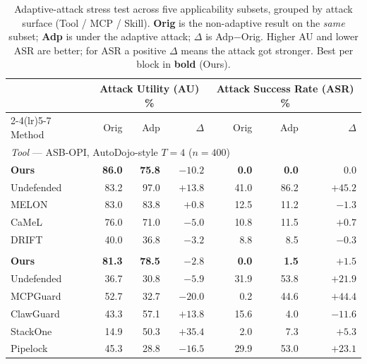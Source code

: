 \begin{table}[t]
\centering
\small
\setlength{\tabcolsep}{6pt}
\renewcommand{\arraystretch}{1.08}
\caption{Adaptive-attack stress test across five applicability subsets, grouped by
attack surface (Tool / MCP / Skill). \textbf{Orig} is the non-adaptive result on
the \emph{same} subset; \textbf{Adp} is under the adaptive attack; $\Delta$ is
Adp$-$Orig. Higher AU and lower ASR are better; for ASR a positive $\Delta$ means
the attack got stronger. Best per block in \textbf{bold} (Ours).}
\label{tab:adaptive}
\begin{tabular}{l rrr rrr}
\toprule
 & \multicolumn{3}{c}{\textbf{Attack Utility (AU) \%}} & \multicolumn{3}{c}{\textbf{Attack Success Rate (ASR) \%}} \\
\cmidrule(lr){2-4}\cmidrule(lr){5-7}
Method & Orig & Adp & $\Delta$ & Orig & Adp & $\Delta$ \\
\midrule
\multicolumn{7}{l}{\textit{Tool} — ASB-OPI, AutoDojo-style $T{=}4$ ($n{=}400$)} \\
\textbf{Ours} & \textbf{86.0} & \textbf{75.8} & $-10.2$ & \textbf{0.0} & \textbf{0.0} & $0.0$ \\
Undefended    & 83.2 & 97.0 & $+13.8$ & 41.0 & 86.2 & $+45.2$ \\
MELON         & 83.0 & 83.8 & $+0.8$  & 12.5 & 11.2 & $-1.3$ \\
CaMeL         & 76.0 & 71.0 & $-5.0$  & 10.8 & 11.5 & $+0.7$ \\
DRIFT         & 40.0 & 36.8 & $-3.2$  & 8.8  & 8.5  & $-0.3$ \\
\addlinespace[2pt]
\midrule
\multicolumn{7}{l}{\textit{MCP} — MCPTox Template-2, MCP-ITP $N5T2m3$ ($n{=}455$)} \\
\textbf{Ours} & \textbf{81.3} & \textbf{78.5} & $-2.8$  & \textbf{0.0} & \textbf{1.5} & $+1.5$ \\
Undefended    & 36.7 & 30.8 & $-5.9$  & 31.9 & 53.8 & $+21.9$ \\
MCPGuard      & 52.7 & 32.7 & $-20.0$ & 0.2  & 44.6 & $+44.4$ \\
ClawGuard     & 43.3 & 57.1 & $+13.8$ & 15.6 & 4.0  & $-11.6$ \\
StackOne      & 14.9 & 50.3 & $+35.4$ & 2.0  & 7.3  & $+5.3$ \\
Pipelock      & 45.3 & 28.8 & $-16.5$ & 29.9 & 53.0 & $+23.1$ \\

\end{tabular}
\end{table}
